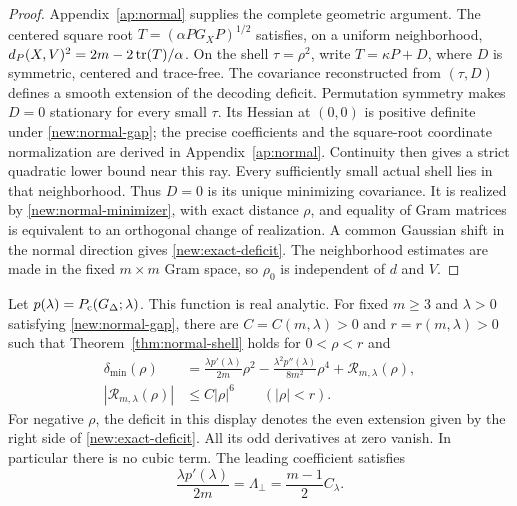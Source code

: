 \begin{proof}
Appendix~\ref{ap:normal} supplies the complete geometric argument.
The centered square root
$T=(\alpha PG_XP)^{1/2}$ satisfies, on a uniform neighborhood,
$d_P(X,V)^2=2m-2\operatorname{tr}(T)/\alpha$.
On the shell $\tau=\rho^2$, write $T=\kappa P+D$, where
$D$ is symmetric, centered and trace-free.
The covariance reconstructed from $(\tau,D)$ defines a smooth
extension of the decoding deficit. Permutation symmetry makes $D=0$
stationary for every small $\tau$.
Its Hessian at $(0,0)$ is positive definite under \eqref{new:normal-gap};
the precise coefficients and the square-root coordinate normalization
are derived in Appendix~\ref{ap:normal}.
Continuity then gives a strict quadratic lower bound near this ray.
Every sufficiently small actual shell lies in that neighborhood.
Thus $D=0$ is its unique minimizing covariance.
It is realized by \eqref{new:normal-minimizer}, with exact distance $\rho$,
and equality of Gram matrices is equivalent to an orthogonal change
of realization. A common Gaussian shift in the normal direction gives
\eqref{new:exact-deficit}. The neighborhood estimates are made in the
fixed $m\times m$ Gram space, so $\rho_0$ is independent of $d$ and $V$.
\end{proof}

\begin{theorem}
\label{thm:normal-taylor}
Let $p(\lambda)=P_{\mathrm c}(G_\Delta;\lambda)$. This function is real analytic.
For fixed $m\ge3$ and $\lambda>0$ satisfying \eqref{new:normal-gap},
there are $C=C(m,\lambda)>0$ and $r=r(m,\lambda)>0$ such that
Theorem~\ref{thm:normal-shell} holds for $0<\rho<r$ and
\begin{align}
 \delta_{\min}(\rho)
 &=\frac{\lambda p'(\lambda)}{2m}\rho^2
   -\frac{\lambda^2p''(\lambda)}{8m^2}\rho^4+\mathcal R_{m,\lambda}(\rho),
 \label{new:quartic}\\
 |\mathcal R_{m,\lambda}(\rho)|&\le C|\rho|^6
       \qquad (|\rho|<r).\label{new:remainder}
\end{align}
For negative $\rho$, the deficit in this display denotes the even
extension given by the right side of \eqref{new:exact-deficit}.
All its odd derivatives at zero vanish. In particular there is no cubic
term. The leading coefficient satisfies
\begin{equation}\label{new:curvature-check}
 \frac{\lambda p'(\lambda)}{2m}=\Lambda_\perp
       =\frac{m-1}{2}C_\lambda.
\end{equation}
\end{theorem}


